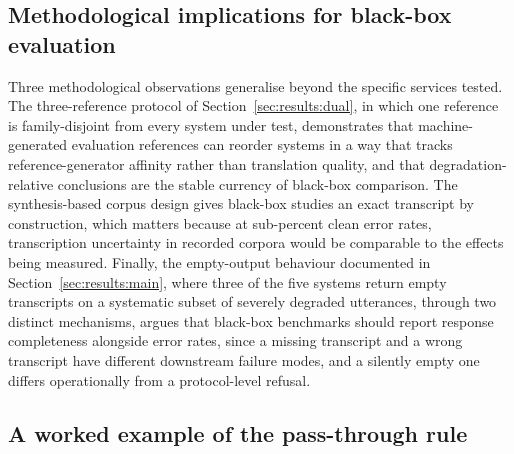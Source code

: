 \subsection{Methodological implications for black-box evaluation}

Three methodological observations generalise beyond the specific services
tested. The three-reference protocol of Section~\ref{sec:results:dual}, in
which one reference is family-disjoint from every system under test,
demonstrates that machine-generated evaluation references can reorder
systems in a way that tracks reference-generator affinity rather than
translation quality, and that degradation-relative conclusions are the
stable currency of black-box comparison. The synthesis-based corpus design
gives black-box studies an exact transcript by construction, which matters
because at sub-percent clean error rates, transcription uncertainty in
recorded corpora would be comparable to the effects being measured. Finally,
the empty-output behaviour documented in Section~\ref{sec:results:main},
where three of the five systems return empty transcripts on a systematic
subset of severely degraded utterances, through two distinct mechanisms,
argues that black-box benchmarks should report response completeness
alongside error rates, since a missing transcript and a wrong transcript
have different downstream failure modes, and a silently empty one differs
operationally from a protocol-level refusal.

\subsection{A worked example of the pass-through rule}

